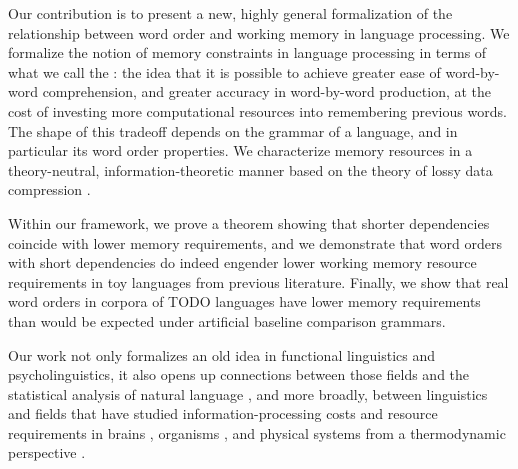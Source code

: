 Our contribution is to present a new, highly general formalization of the relationship between word order and working memory in language processing. We formalize the notion of memory constraints in language processing in terms of what we call the : the idea that it is possible to achieve greater ease of word-by-word comprehension, and greater accuracy in word-by-word production, at the cost of investing more computational resources into remembering previous words.
The shape of this tradeoff depends on the grammar of a language, and in particular its word order properties.
We characterize memory resources in a theory-neutral, information-theoretic manner based on the theory of lossy data compression \citep{cover2006elements,berger}. %


Within our framework, we prove a theorem showing that shorter dependencies coincide with lower memory requirements, and we demonstrate that word orders with short dependencies do indeed engender lower working memory resource requirements in toy languages from previous literature. Finally, we show that real word orders in corpora of TODO languages have lower memory requirements than would be expected under artificial baseline comparison grammars. 

Our work not only formalizes an old idea in functional linguistics and psycholinguistics, it also opens up connections between those fields and the statistical analysis of natural language \citep{debowski-excess-2011,bentz2017word,lin-critical-2017}, and more broadly, between linguistics and fields that have studied information-processing costs and resource requirements in brains \citep{friston}, organisms \citep{england}, and physical systems from a thermodynamic perspective \citep{still}. %












